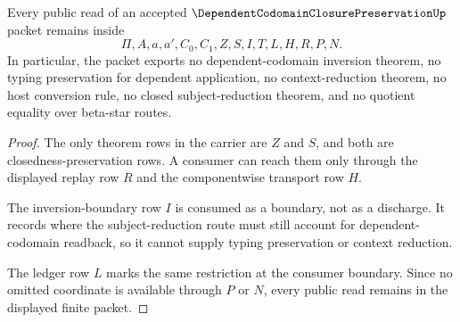 \begin{theorem}
\label{thm:dependent-codomain-closure-preservation-nonescape}
Every public read of an accepted $\DependentCodomainClosurePreservationUp$ packet remains inside
$$
\Pi,A,a,a',C_0,C_1,Z,S,I,T,L,H,R,P,N.
$$
In particular, the packet exports no dependent-codomain inversion theorem, no typing preservation for dependent application, no context-reduction theorem, no host conversion rule, no closed subject-reduction theorem, and no quotient equality over beta-star routes.
\end{theorem}
\begin{proof}
The only theorem rows in the carrier are $Z$ and $S$, and both are closedness-preservation rows. A consumer can reach them only through the displayed replay row $R$ and the componentwise transport row $H$.

The inversion-boundary row $I$ is consumed as a boundary, not as a discharge. It records where the subject-reduction route must still account for dependent-codomain readback, so it cannot supply typing preservation or context reduction.

The ledger row $L$ marks the same restriction at the consumer boundary. Since no omitted coordinate is available through $P$ or $N$, every public read remains in the displayed finite packet.
\end{proof}

